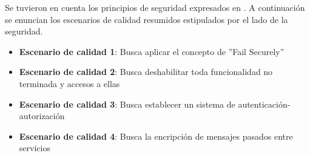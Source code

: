 Se tuvieron en cuenta los principios de seguridad expresados en \cite{security_ws}. A continuación se enuncian los escenarios de calidad resumidos estipulados por el lado de la seguridad.

\begin{itemize}
	\item \textbf{Escenario de calidad 1}: Busca aplicar el concepto de ''Fail Securely''
	\item \textbf{Escenario de calidad 2}: Busca deshabilitar toda funcionalidad no terminada y accesos a ellas
	\item \textbf{Escenario de calidad 3}: Busca establecer un sistema de autenticación-autorización
	\item \textbf{Escenario de calidad 4}: Busca la encripción de mensajes pasados entre servicios
\end{itemize}